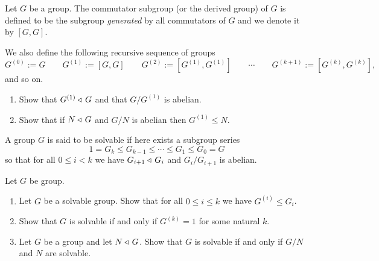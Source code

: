 \documentclass[11pt,a4paper]{article}
\begin{document}
\begin{definition}
  Let $G$ be a group.
  The commutator subgroup (or the derived group) of $G$
  is defined to be the subgroup \textit{generated} by
  all commutators of $G$ and we denote it by $[G,G]$.
\end{definition}
\begin{remark}
  We also define the following recursive sequence of groups
  \[
    G^{(0)} := G \qquad
    G^{(1)} := [G,G] \qquad
    G^{(2)} := [G^{(1)},G^{(1)}] \qquad \cdots \qquad
    G^{(k+1)} := [G^{(k)},G^{(k)}],
  \]
  and so on.
\end{remark}

\begin{exercise} \phantom{}
  \begin{enumerate}
    \item[(1)] Show that $G^{(1)} \triangleleft\, G$ and that $G/G^{(1)}$ is abelian.
    \item[(2)] Show that if $N \triangleleft\, G$ and $G/N$ is abelian
      then $G^{(1)} \leqslant N$.
  \end{enumerate}
\end{exercise}

\begin{definition}
  A group $G$ is said to be solvable if here exists a subgroup series
  \[
    1 = G_k \leqslant G_{k-1} \leqslant \cdots \leqslant G_1 \leqslant G_0 = G
  \]
  so that for all $0 \le i < k$ we have
  $G_{i+1} \triangleleft\, G_i$ and $G_{i}/G_{i+1}$ is abelian.
\end{definition}

\begin{exercise}
  Let $G$ be group.
  \begin{enumerate}
    \item[(1)] Let $G$ be a solvable group.
      Show that for all $0 \le i \le k$ we have $G^{(i)} \leqslant G_i$.
    \item[(2)] Show that $G$ is solvable if and only if $G^{(k)} = 1$
      for some natural $k$.
    \item[(3)] Let $G$ be a group and let $N \triangleleft\, G$.
      Show that $G$ is solvable if and only if $G/N$ and $N$
      are solvable.
  \end{enumerate}
\end{exercise}
\end{document}
